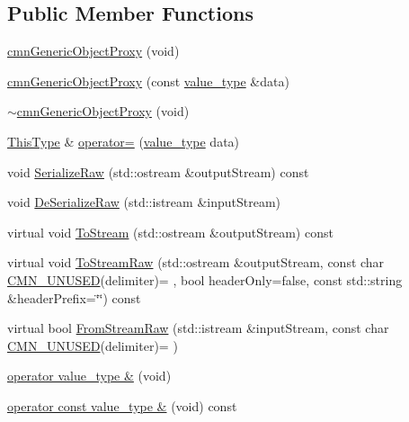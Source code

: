 \subsection*{Public Member Functions}
\begin{DoxyCompactItemize}
\item 
\hyperlink{classcmn_generic_object_proxy_a3a7b07e56467bd563879e5e3fa71b3bf}{cmn\+Generic\+Object\+Proxy} (void)
\item 
\hyperlink{classcmn_generic_object_proxy_aec23f04b937e22288af731b9c9714b02}{cmn\+Generic\+Object\+Proxy} (const \hyperlink{classcmn_generic_object_proxy_a5a3db96e5acd73055d5d34c25c1635f3}{value\+\_\+type} \&data)
\item 
\hyperlink{classcmn_generic_object_proxy_aea3ad15723db9a0c1924936fd25910e6}{$\sim$cmn\+Generic\+Object\+Proxy} (void)
\item 
\hyperlink{classcmn_generic_object_proxy_a4ad0391ca48ebfb86d6bbda89a98c99d}{This\+Type} \& \hyperlink{classcmn_generic_object_proxy_aa4c5ad5bd8655ed6974c9dcbf096dc90}{operator=} (\hyperlink{classcmn_generic_object_proxy_a5a3db96e5acd73055d5d34c25c1635f3}{value\+\_\+type} data)
\item 
void \hyperlink{classcmn_generic_object_proxy_adaa26a00b9f13b78647282c0badc6cb2}{Serialize\+Raw} (std\+::ostream \&output\+Stream) const 
\item 
void \hyperlink{classcmn_generic_object_proxy_a62d6acac550f9e25469256e2cec9edb9}{De\+Serialize\+Raw} (std\+::istream \&input\+Stream)
\item 
virtual void \hyperlink{classcmn_generic_object_proxy_a595129d5bb131263104a840967c7580d}{To\+Stream} (std\+::ostream \&output\+Stream) const 
\item 
virtual void \hyperlink{classcmn_generic_object_proxy_a7741c043f8f9c07559b6a66d8e411fe6}{To\+Stream\+Raw} (std\+::ostream \&output\+Stream, const char \hyperlink{cmn_portability_8h_a021894e2626935fa2305434b1e893ff6}{C\+M\+N\+\_\+\+U\+N\+U\+S\+E\+D}(delimiter)= \textquotesingle{} \textquotesingle{}, bool header\+Only=false, const std\+::string \&header\+Prefix=\char`\"{}\char`\"{}) const 
\item 
virtual bool \hyperlink{classcmn_generic_object_proxy_af76004eb71b542b5e96d1790db55156d}{From\+Stream\+Raw} (std\+::istream \&input\+Stream, const char \hyperlink{cmn_portability_8h_a021894e2626935fa2305434b1e893ff6}{C\+M\+N\+\_\+\+U\+N\+U\+S\+E\+D}(delimiter)= \textquotesingle{} \textquotesingle{})
\end{DoxyCompactItemize}
{\bf }\par
\begin{DoxyCompactItemize}
\item 
\hyperlink{classcmn_generic_object_proxy_ad73eae195ede0ec2a76eea5782ad7662}{operator value\+\_\+type \&} (void)
\item 
\hyperlink{classcmn_generic_object_proxy_ae14120d331171dfd20e03086f1baa72e}{operator const value\+\_\+type \&} (void) const 
\end{DoxyCompactItemize}

